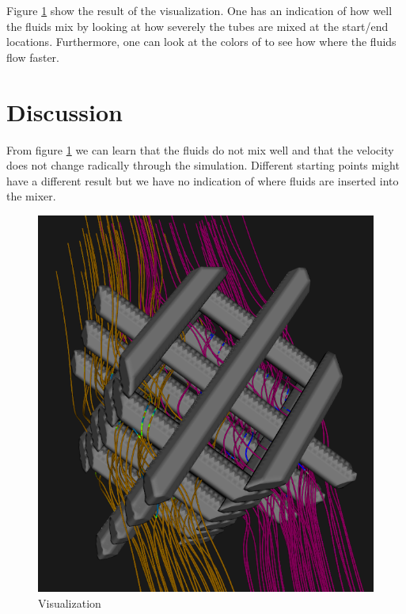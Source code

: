 \documentclass{article}[10pt]
\begin{document}
Figure \ref{fig:1} show the result of the visualization. One has an indication
of how well the fluids mix by looking at how severely the tubes are mixed at the
start/end locations. Furthermore, one can look at the colors of to see how where
the fluids flow faster.

\section{Discussion}
From figure \ref{fig:1} we can learn that the fluids do not mix well and that
the velocity does not change radically through the simulation. Different
starting points might have a different result but we have no indication of where
fluids are inserted into the mixer.

\begin{figure}[h]
    \includegraphics[width=\textwidth]{purple_yellow}
    \caption{Visualization}
    \label{fig:1}
\end{figure}
\end{document}
